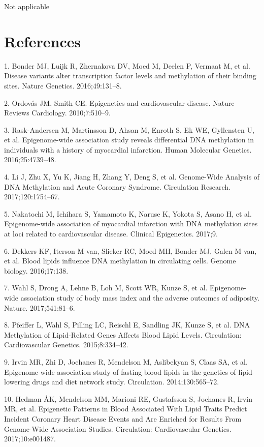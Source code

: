 \documentclass[]{bmcart}
\theoremstyle{definition}
\theoremstyle{definition}
\theoremstyle{definition}
\theoremstyle{remark}
\begin{document}
Not applicable

\section{References}\label{references}


1. Bonder MJ, Luijk R, Zhernakova DV, Moed M, Deelen P, Vermaat M, et
al. Disease variants alter transcription factor levels and methylation
of their binding sites. Nature Genetics. 2016;49:131--8.

2. Ordov{á}s JM, Smith CE. Epigenetics and cardiovascular disease.
Nature Reviews Cardiology. 2010;7:510--9.

3. Rask-Andersen M, Martinsson D, Ahsan M, Enroth S, Ek WE, Gyllensten
U, et al. Epigenome-wide association study reveals differential DNA
methylation in individuals with a history of myocardial infarction.
Human Molecular Genetics. 2016;25:4739--48.

4. Li J, Zhu X, Yu K, Jiang H, Zhang Y, Deng S, et al. Genome-Wide
Analysis of DNA Methylation and Acute Coronary Syndrome. Circulation
Research. 2017;120:1754--67.

5. Nakatochi M, Ichihara S, Yamamoto K, Naruse K, Yokota S, Asano H, et
al. Epigenome-wide association of myocardial infarction with DNA
methylation sites at loci related to cardiovascular disease. Clinical
Epigenetics. 2017;9.

6. Dekkers KF, Iterson M van, Slieker RC, Moed MH, Bonder MJ, Galen M
van, et al. Blood lipids influence DNA methylation in circulating cells.
Genome biology. 2016;17:138.

7. Wahl S, Drong A, Lehne B, Loh M, Scott WR, Kunze S, et al.
Epigenome-wide association study of body mass index and the adverse
outcomes of adiposity. Nature. 2017;541:81--6.

8. Pfeiffer L, Wahl S, Pilling LC, Reischl E, Sandling JK, Kunze S, et
al. DNA Methylation of Lipid-Related Genes Affects Blood Lipid Levels.
Circulation: Cardiovascular Genetics. 2015;8:334--42.

9. Irvin MR, Zhi D, Joehanes R, Mendelson M, Aslibekyan S, Claas SA, et
al. Epigenome-wide association study of fasting blood lipids in the
genetics of lipid-lowering drugs and diet network study. Circulation.
2014;130:565--72.

10. Hedman ÅK, Mendelson MM, Marioni RE, Gustafsson S, Joehanes R, Irvin
MR, et al. Epigenetic Patterns in Blood Associated With Lipid Traits
Predict Incident Coronary Heart Disease Events and Are Enriched for
Results From Genome-Wide Association Studies. Circulation:
Cardiovascular Genetics. 2017;10:e001487.
\end{document}
